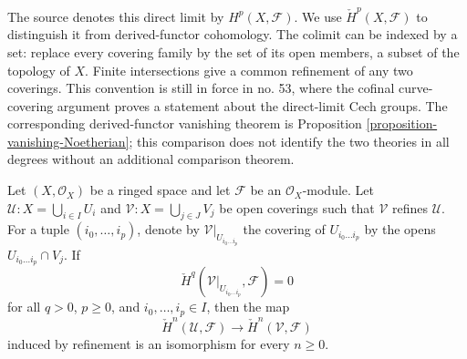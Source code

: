 \begin{remark}
\label{remark-FAC-cech-colimit-notation}
\begin{reference}
\cite[Chapter I, \S 3, no. 22 and footnote 2, p. 215]{FAC}
\cite[Chapter III, \S 1, no. 53, Proposition 4 and Remark,
pp. 245--246]{FAC}
\end{reference}
The source denotes this direct limit by $H^p(X, \mathcal{F})$. We use
$\check{H}^p(X, \mathcal{F})$ to distinguish it from derived-functor
cohomology. The colimit can be indexed by a set: replace every covering
family by the set of its open members, a subset of the topology of $X$.
Finite intersections give a common refinement of any two coverings.
This convention is still in force in no. 53, where the cofinal curve-covering
argument proves a statement about the direct-limit Cech groups. The
corresponding derived-functor vanishing theorem is Proposition
\ref{proposition-vanishing-Noetherian}; this comparison does not identify the
two theories in all degrees without an additional comparison theorem.
\end{remark}

\begin{lemma}
\label{lemma-cech-refinement-acyclic}
\begin{reference}
\cite[Chapter I, \S 4, no. 29, Propositions 3--5,
pp. 221--222]{FAC}
\end{reference}
Let $(X, \mathcal{O}_X)$ be a ringed space and let
$\mathcal{F}$ be an $\mathcal{O}_X$-module. Let
$\mathcal{U} : X = \bigcup_{i \in I} U_i$ and
$\mathcal{V} : X = \bigcup_{j \in J} V_j$ be open coverings such that
$\mathcal{V}$ refines $\mathcal{U}$. For a tuple
$(i_0, \ldots, i_p)$, denote by
$\mathcal{V}|_{U_{i_0 \ldots i_p}}$ the covering of
$U_{i_0 \ldots i_p}$ by the opens
$U_{i_0 \ldots i_p} \cap V_j$. If
$$
\check{H}^q(\mathcal{V}|_{U_{i_0 \ldots i_p}}, \mathcal{F}) = 0
$$
for all $q > 0$, $p \geq 0$, and $i_0, \ldots, i_p \in I$, then the
map
$$
\check{H}^n(\mathcal{U}, \mathcal{F})
\longrightarrow
\check{H}^n(\mathcal{V}, \mathcal{F})
$$
induced by refinement is an isomorphism for every $n \geq 0$.
\end{lemma}

